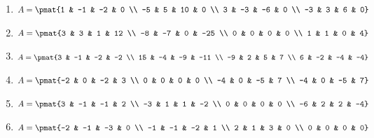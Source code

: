 \begin{enumerate}
\item

\begin{align*}
A = \pmat{1 & -1 & -2 & 0 \\ -5 & 5 & 10 & 0 \\ 3 & -3 & -6 & 0 \\ -3 & 3 & 6 & 0}
\end{align*}

\item

\begin{align*}
A = \pmat{3 & 3 & 1 & 12 \\ -8 & -7 & 0 & -25 \\ 0 & 0 & 0 & 0 \\ 1 & 1 & 0 & 4}
\end{align*}

\item

\begin{align*}
A = \pmat{3 & -1 & -2 & -2 \\ 15 & -4 & -9 & -11 \\ -9 & 2 & 5 & 7 \\ 6 & -2 & -4 & -4}
\end{align*}

\item

\begin{align*}
A = \pmat{-2 & 0 & -2 & 3 \\ 0 & 0 & 0 & 0 \\ -4 & 0 & -5 & 7 \\ -4 & 0 & -5 & 7}
\end{align*}

\item

\begin{align*}
A = \pmat{3 & -1 & -1 & 2 \\ -3 & 1 & 1 & -2 \\ 0 & 0 & 0 & 0 \\ -6 & 2 & 2 & -4}
\end{align*}

\item

\begin{align*}
A = \pmat{-2 & -1 & -3 & 0 \\ -1 & -1 & -2 & 1 \\ 2 & 1 & 3 & 0 \\ 0 & 0 & 0 & 0}
\end{align*}


\end{enumerate}
